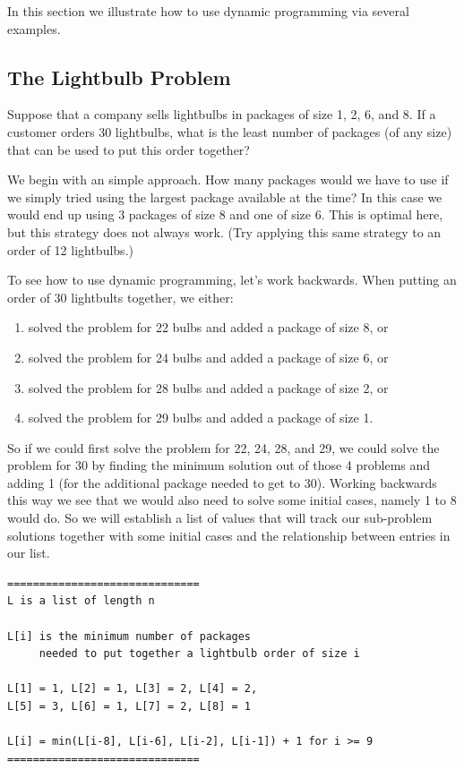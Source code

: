 \documentclass{ximera}
\begin{document}
In this section we illustrate how to use dynamic programming via several examples.

\subsection{The Lightbulb Problem}

Suppose that a company sells lightbulbs in packages of size 1, 2, 6, and 8. If a customer orders 30 lightbulbs, what is the least number of packages (of any size) that can be used to put this order together?

We begin with an simple approach. How many packages would we have to use if we simply tried using the largest package available at the time? In this case we would end up using 3 packages of size 8 and one of size 6. This is optimal here, but this strategy does not always work. (Try applying this same strategy to an order of 12 lightbulbs.)

To see how to use dynamic programming, let's work backwards. When putting an order of 30 lightbults together, we either:
\begin{enumerate}
	\item solved the problem for 22 bulbs and added a package of size 8, or 
	\item solved the problem for 24 bulbs and added a package of size 6, or 
	\item solved the problem for 28 bulbs and added a package of size 2, or 
	\item solved the problem for 29 bulbs and added a package of size 1.
\end{enumerate}
So if we could first solve the problem for 22, 24, 28, and 29, we could solve the problem for 30 by finding the minimum solution out of those 4 problems and adding 1 (for the additional package needed to get to 30). Working backwards this way we see that we would also need to solve some initial cases, namely 1 to 8 would do. So we will establish a list of values that will track our sub-problem solutions together with some initial cases and the relationship between entries in our list.
\begin{verbatim}
==============================
L is a list of length n

L[i] is the minimum number of packages 
     needed to put together a lightbulb order of size i

L[1] = 1, L[2] = 1, L[3] = 2, L[4] = 2, 
L[5] = 3, L[6] = 1, L[7] = 2, L[8] = 1

L[i] = min(L[i-8], L[i-6], L[i-2], L[i-1]) + 1 for i >= 9
==============================
\end{verbatim}
\end{document}
